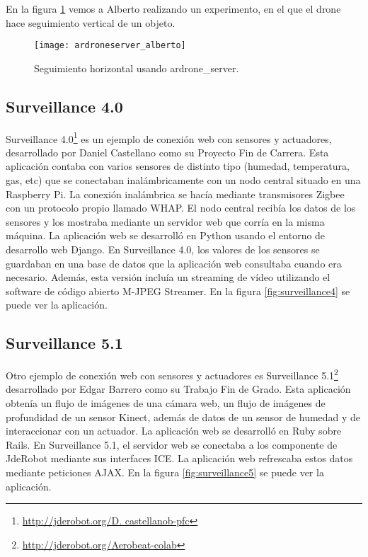 En la figura \ref{fig:ardroneserveralberto} vemos a Alberto realizando un experimento, en el que el drone hace seguimiento vertical de un objeto.\\

\begin{figure}[h!]
\centering
\texttt{[image: ardroneserver\_alberto]}
\caption{Seguimiento horizontal usando ardrone\_server.}
\label{fig:ardroneserveralberto}
\end{figure}

\subsection{Surveillance 4.0}

Surveillance 4.0\footnote{\url{http://jderobot.org/D. castellanob-pfc}}\cite{surveillance4.0} es un ejemplo de conexión web con sensores y actuadores, desarrollado por Daniel Castellano como su Proyecto Fin de Carrera. Esta aplicación contaba con varios sensores de distinto tipo (humedad, temperatura, gas, etc) que se conectaban inalámbricamente con un nodo central situado en una Raspberry Pi. La conexión inalámbrica se hacía mediante transmisores Zigbee con un protocolo propio llamado WHAP. El nodo central recibía los datos de los sensores y los mostraba mediante un servidor web que corría en la misma máquina. La aplicación web se desarrolló en Python usando el entorno de desarrollo web Django. En Surveillance 4.0, los valores de los sensores se guardaban en una base de datos que la aplicación web consultaba cuando era necesario. Además, esta versión incluía un streaming de vídeo utilizando el software de código abierto M-JPEG Streamer. En la figura \ref{fig:surveillance4} se puede ver la aplicación.\\


\subsection{Surveillance 5.1}

Otro ejemplo de conexión web con sensores y actuadores es Surveillance 5.1\footnote{\url{http://jderobot.org/Aerobeat-colab}}\cite{surveillance5.1} desarrollado por Edgar Barrero como su Trabajo Fin de Grado. Esta aplicación obtenía un flujo de imágenes de una cámara web, un flujo de imágenes de profundidad de un sensor Kinect, además de datos de un sensor de humedad y de interaccionar con un actuador. La aplicación web se desarrolló en Ruby sobre Rails. En Surveillance 5.1, el servidor web se conectaba a los componente de JdeRobot mediante sus interfaces ICE. La aplicación web refrescaba estos datos mediante peticiones AJAX.  En la figura \ref{fig:surveillance5} se puede ver la aplicación.\\


